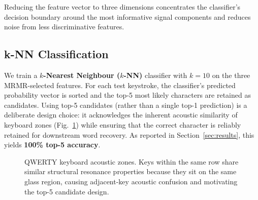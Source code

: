 \documentclass[conference]{IEEEtran}
\begin{document}
Reducing the feature vector to three dimensions concentrates the classifier's decision boundary around the most informative signal components and reduces noise from less discriminative features.

\subsection{k-NN Classification}

We train a \textbf{$k$-Nearest Neighbour ($k$-NN)} classifier with $k{=}10$ on the three MRMR-selected features. For each test keystroke, the classifier's predicted probability vector is sorted and the top-5 most likely characters are retained as candidates. Using top-5 candidates (rather than a single top-1 prediction) is a deliberate design choice: it acknowledges the inherent acoustic similarity of keyboard zones (Fig.~\ref{fig:keyboard}) while ensuring that the correct character is reliably retained for downstream word recovery. As reported in Section~\ref{sec:results}, this yields \textbf{100\% top-5 accuracy}.

\begin{figure}[h]
\centering
{}
\caption{QWERTY keyboard acoustic zones. Keys within the same row share similar structural resonance properties because they sit on the same glass region, causing adjacent-key acoustic confusion and motivating the top-5 candidate design.}
\label{fig:keyboard}
\end{figure}
\end{document}
